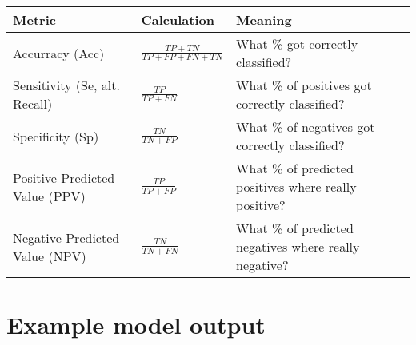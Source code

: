 \renewcommand{\arraystretch}{1.5}
\begin{table}[h!]
    \centering
    \begin{tabular}{p{3cm} p{2cm} p{4.4cm}}
        Metric & Calculation & Meaning \\
        \hline
        Accurracy \newline (Acc) & $\frac{TP+TN}{TP+FP+FN+TN}$ & What \% got correctly \newline classified? \\
        Sensitivity \newline (Se, alt. Recall) & $\frac{TP}{TP+FN}$ & What \% of positives got \newline correctly classified? \\
        Specificity \newline (Sp) & $\frac{TN}{TN+FP}$ & What \% of negatives got \newline correctly classified? \\
        Positive Predicted \newline Value (PPV) & $\frac{TP}{TP+FP}$ & What \% of predicted positives \newline where really positive? \\
        Negative Predicted \newline Value (NPV) & $\frac{TN}{TN+FN}$ & What \% of predicted negatives \newline where really negative? \\
    \end{tabular}
\end{table}

\chapter{Example model output}

